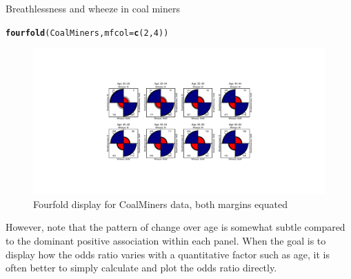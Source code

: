 \documentclass[11pt]{book}\usepackage[]{graphicx}\usepackage[]{color}
\makeatletter
\newcommand{\hlnum}[1]{\textcolor[rgb]{0.686,0.059,0.569}{#1}}%
\newcommand{\hlstd}[1]{\textcolor[rgb]{0.345,0.345,0.345}{#1}}%
\newcommand{\hlkwc}[1]{\textcolor[rgb]{0.333,0.667,0.333}{#1}}%
\newcommand{\hlkwd}[1]{\textcolor[rgb]{0.737,0.353,0.396}{\textbf{#1}}}%
\newenvironment{kframe}{%
 \def\at@end@of@kframe{}%
 \ifinner\ifhmode%
  \def\at@end@of@kframe{\end{minipage}}%
  \begin{minipage}{\columnwidth}%
 \fi\fi%
 \def\FrameCommand##1{\hskip\@totalleftmargin \hskip-\fboxsep
 \colorbox{shadecolor}{##1}\hskip-\fboxsep
     \hskip-\linewidth \hskip-\@totalleftmargin \hskip\columnwidth}%
 \MakeFramed {\advance\hsize-\width
   \@totalleftmargin\z@ \linewidth\hsize
   \@setminipage}}%
 {\par\unskip\endMakeFramed%
 \at@end@of@kframe}
\newenvironment{knitrout}{}{} %
\renewenvironment{knitrout}{\small\renewcommand{\baselinestretch}{.85}}{} %
\makeatother
\begin{document}
\begin{Example}[wheeze1]{Breathlessness and wheeze in coal miners}
\begin{knitrout}
\color{fgcolor}\begin{kframe}
\begin{alltt}
\hlkwd{fourfold}\hlstd{(CoalMiners,} \hlkwc{mfcol} \hlstd{=} \hlkwd{c}\hlstd{(}\hlnum{2}\hlstd{,}\hlnum{4}\hlstd{))}
\end{alltt}
\end{kframe}\begin{figure}[htbp]


\centerline{\includegraphics[width=\textwidth,trim=120 80 120 80]{ch04/fig/coalminer1} }

\caption[Fourfold display for CoalMiners data, both margins equated]{Fourfold display for CoalMiners data, both margins equated\label{fig:coalminer1}}
\end{figure}


\end{knitrout}


However, note that the pattern of change over age is somewhat subtle
compared to the dominant positive association within each
panel.
When the goal is to display how the odds ratio varies with
a quantitative factor such as age, it is often better to simply
calculate and plot the odds ratio directly.


\end{Example}
\end{document}
